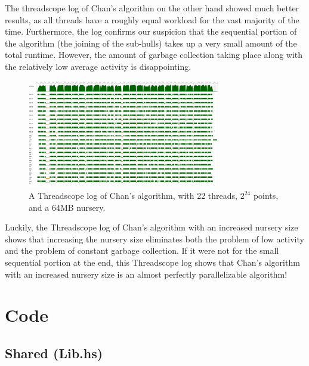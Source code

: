 \documentclass[12pt]{article}
\begin{document}
    The threadscope log of Chan’s algorithm on the other hand showed much better results, as all threads have a roughly equal workload for the vast majority of the time. Furthermore, the log confirms our suspicion that the sequential portion of the algorithm (the joining of the sub-hulls) takes up a very small amount of the total runtime. However, the amount of garbage collection taking place along with the relatively low average activity is disappointing.

    \begin{figure}[h]
      \centering
      \includegraphics[width=0.75\textwidth]{chans2par_A64M_threadscope.png}
      \caption{A Threadscope log of Chan's algorithm, with 22 threads, $2^{24}$ points, and a 64MB nursery.}
    \end{figure}
    Luckily, the Threadscope log of Chan’s algorithm with an increased nursery size shows that increasing the nursery size eliminates both the problem of low activity and the problem of constant garbage collection. If it were not for the small sequential portion at the end, this Threadscope log shows that Chan’s algorithm with an increased nursery size is an almost perfectly parallelizable algorithm!

  \newpage
  \section*{Code}

    \subsection*{Shared (Lib.hs)}
\end{document}

